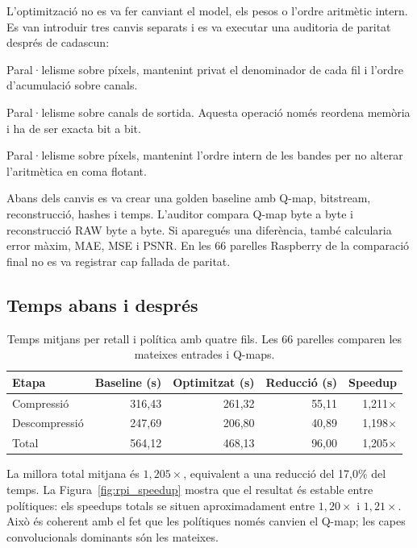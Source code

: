 L'optimització no es va fer canviant el model, els pesos o l'ordre aritmètic
intern. Es van introduir tres canvis separats i es va executar una auditoria de
paritat després de cadascun:

\begin{description}[leftmargin=3.7cm,style=nextline]
  \item[GDN i IGDN] Paral·lelisme sobre píxels, mantenint privat el denominador
  de cada fil i l'ordre d'acumulació sobre canals.
  \item[Depth-to-space] Paral·lelisme sobre canals de sortida. Aquesta operació
  només reordena memòria i ha de ser exacta bit a bit.
  \item[Transformada espectral] Paral·lelisme sobre píxels, mantenint l'ordre
  intern de les bandes per no alterar l'aritmètica en coma flotant.
\end{description}

Abans dels canvis es va crear una golden baseline amb Q-map, bitstream,
reconstrucció, hashes i temps. L'auditor compara Q-map byte a byte i
reconstrucció RAW byte a byte. Si aparegués una diferència, també calcularia
error màxim, MAE, MSE i PSNR. En les 66 parelles Raspberry de la comparació
final no es va registrar cap fallada de paritat.

\subsection{Temps abans i després}

\begin{table}[H]
\centering
\small
\begin{tabular}{lrrrr}
\toprule
Etapa & Baseline (s) & Optimitzat (s) & Reducció (s) & Speedup \\
\midrule
Compressió & 316,43 & 261,32 & 55,11 & 1,211$\times$ \\
Descompressió & 247,69 & 206,80 & 40,89 & 1,198$\times$ \\
Total & 564,12 & 468,13 & 96,00 & 1,205$\times$ \\
\bottomrule
\end{tabular}
\caption{Temps mitjans per retall i política amb quatre fils. Les 66 parelles
comparen les mateixes entrades i Q-maps.}
\label{tab:rpi_optimized_time}
\end{table}

La millora total mitjana és $1,205\times$, equivalent a una reducció del
17,0\% del temps. La Figura~\ref{fig:rpi_speedup} mostra que el resultat és
estable entre polítiques: els speedups totals se situen aproximadament entre
$1,20\times$ i $1,21\times$. Això és coherent amb el fet que les polítiques
només canvien el Q-map; les capes convolucionals dominants són les mateixes.

